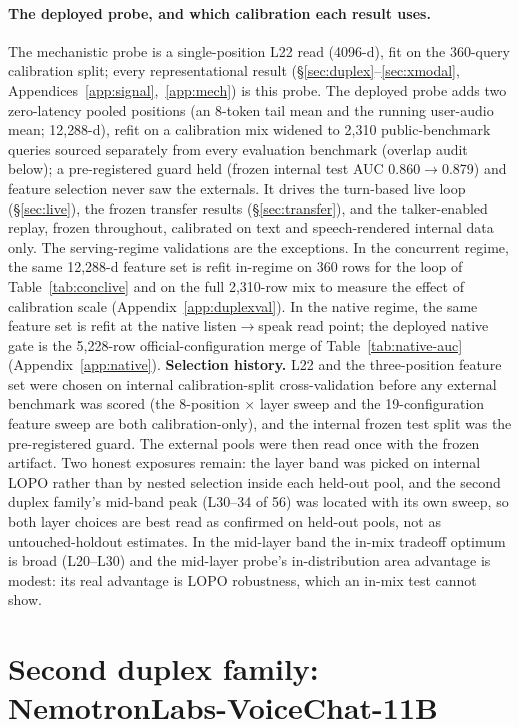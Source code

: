 \paragraph{The deployed probe, and which calibration each result
uses.} The mechanistic probe is a single-position L22 read (4096-d),
fit on the 360-query calibration split; every representational result
(\S\ref{sec:duplex}--\ref{sec:xmodal},
Appendices~\ref{app:signal},~\ref{app:mech}) is
this probe. The deployed probe adds two zero-latency
pooled positions (an 8-token tail mean and the running user-audio
mean; 12{,}288-d), refit on a calibration mix widened to 2{,}310 public-benchmark
queries sourced separately from every evaluation benchmark (overlap
audit below); a pre-registered
guard held (frozen internal test AUC 0.860$\to$0.879) and feature
selection never saw the externals. It drives the turn-based live loop
(\S\ref{sec:live}), the frozen transfer results (\S\ref{sec:transfer}),
and the talker-enabled replay, frozen throughout, calibrated on text and
speech-rendered internal data only. The serving-regime validations are
the exceptions. In the concurrent regime, the same 12{,}288-d feature
set is refit in-regime on 360 rows for the loop of
Table~\ref{tab:conclive} and on the full 2{,}310-row mix to measure the
effect of calibration scale (Appendix~\ref{app:duplexval}). In the
native regime, the same feature set is refit at the native
listen$\to$speak read point; the deployed native gate is the
5{,}228-row official-configuration merge of
Table~\ref{tab:native-auc} (Appendix~\ref{app:native}).
\textbf{Selection history.} L22 and the three-position feature set were
chosen on internal calibration-split cross-validation before any
external benchmark was scored (the 8-position $\times$ layer sweep and
the 19-configuration feature sweep are both calibration-only), and
the internal frozen test split was the pre-registered guard. The
external pools were then read once with the frozen artifact. Two
honest exposures remain: the layer band was picked on internal
LOPO rather than by nested selection inside each held-out pool, and
the second duplex family's mid-band peak (L30--34 of 56) was located
with its own sweep, so both layer choices are best read as
confirmed on held-out pools, not as untouched-holdout
estimates. In the mid-layer band the in-mix
tradeoff optimum is broad (L20--L30) and the mid-layer probe's
in-distribution area advantage is modest: its real advantage is
LOPO robustness, which an in-mix test cannot show.

\section{Second duplex family: NemotronLabs-VoiceChat-11B}
\label{app:nvda}

